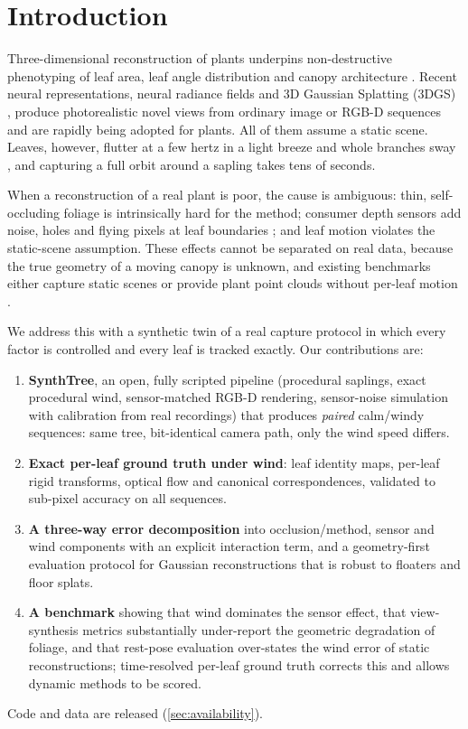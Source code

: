 \documentclass[preprint,11pt,authoryear]{elsarticle}
\begin{document}
\section{Introduction}
Three-dimensional reconstruction of plants underpins non-destructive phenotyping of leaf area, leaf angle distribution and canopy architecture \citep{paulus2019crops3d}. Recent neural representations, neural radiance fields \citep{mildenhall2020nerf,muller2022instant} and 3D Gaussian Splatting (3DGS) \citep{kerbl2023gaussian}, produce photorealistic novel views from ordinary image or RGB-D sequences and are rapidly being adopted for plants. All of them assume a static scene. Leaves, however, flutter at a few hertz in a light breeze and whole branches sway \citep{delangre2008wind}, and capturing a full orbit around a sapling takes tens of seconds.

When a reconstruction of a real plant is poor, the cause is ambiguous: thin, self-occluding foliage is intrinsically hard for the method; consumer depth sensors add noise, holes and flying pixels at leaf boundaries \citep{khoshelham2012kinect,keselman2017realsense}; and leaf motion violates the static-scene assumption. These effects cannot be separated on real data, because the true geometry of a moving canopy is unknown, and existing benchmarks either capture static scenes \citep{jensen2014dtu,knapitsch2017tanks,sturm2012tum} or provide plant point clouds without per-leaf motion \citep{schunck2021pheno4d}.

We address this with a synthetic twin of a real capture protocol in which every factor is controlled and every leaf is tracked exactly. Our contributions are:
\begin{enumerate}
\item \textbf{SynthTree}, an open, fully scripted pipeline (procedural saplings, exact procedural wind, sensor-matched RGB-D rendering, sensor-noise simulation with calibration from real recordings) that produces \emph{paired} calm/windy sequences: same tree, bit-identical camera path, only the wind speed differs.
\item \textbf{Exact per-leaf ground truth under wind}: leaf identity maps, per-leaf rigid transforms, optical flow and canonical correspondences, validated to sub-pixel accuracy on all sequences.
\item \textbf{A three-way error decomposition} into occlusion/method, sensor and wind components with an explicit interaction term, and a geometry-first evaluation protocol for Gaussian reconstructions that is robust to floaters and floor splats.
\item \textbf{A benchmark} showing that wind dominates the sensor effect, that view-synthesis metrics substantially under-report the geometric degradation of foliage, and that rest-pose evaluation over-states the wind error of static reconstructions; time-resolved per-leaf ground truth corrects this and allows dynamic methods to be scored.
\end{enumerate}
Code and data are released (\cref{sec:availability}).
\end{document}
